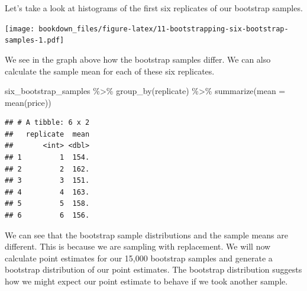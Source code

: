 \documentclass[
]{krantz}
\makeatletter
\newenvironment{Shaded}{\begin{snugshade}}{\end{snugshade}}
\newcommand{\AttributeTok}[1]{\textcolor[rgb]{0.61,0.61,0.61}{#1}}
\newcommand{\DecValTok}[1]{\textcolor[rgb]{0.06,0.06,0.06}{#1}}
\newcommand{\FunctionTok}[1]{\textcolor[rgb]{0,0,0}{#1}}
\newcommand{\NormalTok}[1]{#1}
\newcommand{\OtherTok}[1]{\textcolor[rgb]{0.37,0.37,0.37}{#1}}
\newcommand{\SpecialCharTok}[1]{\textcolor[rgb]{0,0,0}{#1}}
\newcommand{\StringTok}[1]{\textcolor[rgb]{0.5,0.5,0.5}{#1}}
\newenvironment{kframe}{%
\medskip{}
\setlength{\fboxsep}{.8em}
 \def\at@end@of@kframe{}%
 \ifinner\ifhmode%
  \def\at@end@of@kframe{\end{minipage}}%
  \begin{minipage}{\columnwidth}%
 \fi\fi%
 \def\FrameCommand##1{\hskip\@totalleftmargin \hskip-\fboxsep
 \colorbox{shadecolor}{##1}\hskip-\fboxsep
     \hskip-\linewidth \hskip-\@totalleftmargin \hskip\columnwidth}%
 \MakeFramed {\advance\hsize-\width
   \@totalleftmargin\z@ \linewidth\hsize
   \@setminipage}}%
 {\par\unskip\endMakeFramed%
 \at@end@of@kframe}
\renewenvironment{Shaded}{\begin{kframe}}{\end{kframe}}
\makeatother
\begin{document}
Let's take a look at histograms of the first six replicates of our bootstrap samples.

\begin{Shaded}
\end{Shaded}

\texttt{[image: bookdown\_files/figure-latex/11-bootstrapping-six-bootstrap-samples-1.pdf]}

We see in the graph above how the bootstrap samples differ. We can also calculate the sample mean for each of these six replicates.

\begin{Shaded}
\begin{Highlighting}[]
\NormalTok{six\_bootstrap\_samples }\SpecialCharTok{\%\textgreater{}\%}
  \FunctionTok{group\_by}\NormalTok{(replicate) }\SpecialCharTok{\%\textgreater{}\%}
  \FunctionTok{summarize}\NormalTok{(}\AttributeTok{mean =} \FunctionTok{mean}\NormalTok{(price))}
\end{Highlighting}
\end{Shaded}

\begin{verbatim}
## # A tibble: 6 x 2
##   replicate  mean
##       <int> <dbl>
## 1         1  154.
## 2         2  162.
## 3         3  151.
## 4         4  163.
## 5         5  158.
## 6         6  156.
\end{verbatim}

We can see that the bootstrap sample distributions and the sample means are different. This is because we are sampling with replacement. We will now calculate point estimates for our 15,000 bootstrap samples and generate a bootstrap distribution of our point estimates. The bootstrap distribution suggests how we might expect our point estimate to behave if we took another sample.
\end{document}
